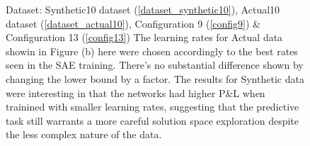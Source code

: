 \documentclass[a4paper,11pt,oneside]{article}
\theoremstyle{plain}
\theoremstyle{definition}
\begin{document}
\begin{figure}[H]
\begin{subfigure}{.5\textwidth}
		\label{figure-actual_pl_minmax_lr}
	\end{subfigure}
	\caption[P\&L by Learning Rates]{Dataset: Synthetic10 dataset (\ref{dataset_synthetic10}), Actual10 dataset (\ref{dataset_actual10}), Configuration 9 (\ref{config9}) \& Configuration 13 (\ref{config13})
		\newline The learning rates for Actual data showin in Figure (b) here were chosen accordingly to the best rates seen in the SAE training. There's no substantial difference shown by changing the lower bound by a factor. The results for Synthetic data were interesting in that the networks had higher P\&L when trainined with smaller learning rates, suggesting that the predictive task still warrants a more careful solution space exploration despite the less complex nature of the data.}
	\label{figure-pl_lr}
\end{figure}
\end{document}
